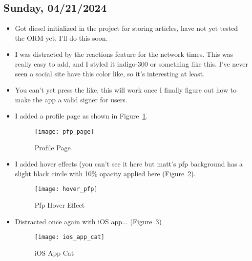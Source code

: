 \subsection*{Sunday, 04/21/2024}
\begin{itemize}
    \item Got diesel initialized in the project for storing articles, have not
        yet tested the ORM yet, I'll do this soon. 
    \item I was distracted by the reactions feature for the network times. This
        was really easy to add, and I styled it indigo-300 or something like
        this. I've never seen a social site have this color like, so it's
        interesting at least.
    \item You can't yet press the like, this will work once I finally figure out
        how to make the app a valid signer for users.
    \item I added a profile page as shown in Figure~\ref{fig:pfp_page}.
        \begin{figure}[ht]
            \centering
            \texttt{[image: pfp\_page]}
            \captionsetup{labelfont=bf, textfont=it}
            \caption{Profile Page}
            \label{fig:pfp_page}
        \end{figure}
    \item I added hover effects (you can't see it here but matt's pfp background
        has a slight black circle with 10\% opacity applied here
        (Figure~\ref{fig:hover_pfp}).
        \begin{figure}[ht]
            \centering
            \texttt{[image: hover\_pfp]}
            \captionsetup{labelfont=bf, textfont=it}
            \caption{Pfp Hover Effect}
            \label{fig:hover_pfp}
        \end{figure}
        \newpage
    \item Distracted once again with iOS app... (Figure~\ref{fig:ios_app_cat})
        \begin{figure}[ht]
            \centering
            \texttt{[image: ios\_app\_cat]}
            \captionsetup{labelfont=bf, textfont=it}
            \caption{iOS App Cat}
            \label{fig:ios_app_cat}
        \end{figure}
\end{itemize}
